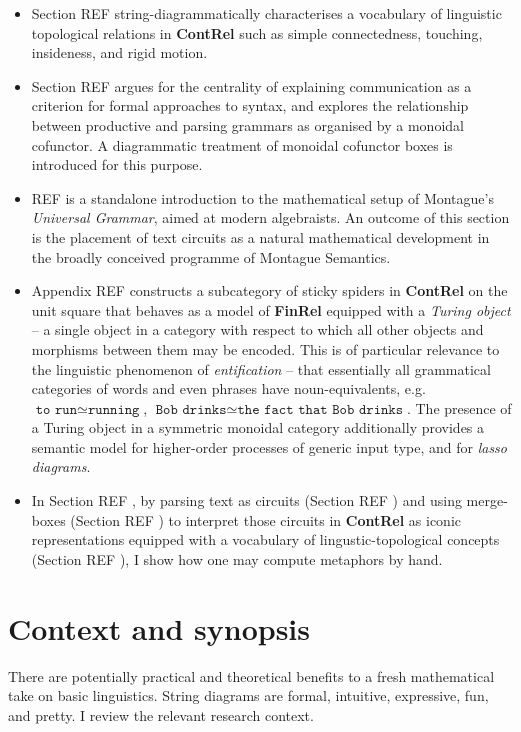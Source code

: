 \begin{myboxB}
\begin{itemize}
\item Section \bR REF \e string-diagrammatically characterises a vocabulary of linguistic topological relations in \textbf{ContRel} such as simple connectedness, touching, insideness, and rigid motion.

\item Section \bR REF \e argues for the centrality of explaining communication as a criterion for formal approaches to syntax, and explores the relationship between productive and parsing grammars as organised by a monoidal cofunctor. A diagrammatic treatment of monoidal cofunctor boxes is introduced for this purpose.

\item \bR REF \e is a standalone introduction to the mathematical setup of Montague's \emph{Universal Grammar}, aimed at modern algebraists. An outcome of this section is the placement of text circuits as a natural mathematical development in the broadly conceived programme of Montague Semantics.

\item Appendix \bR REF \e constructs a subcategory of sticky spiders in \textbf{ContRel} on the unit square that behaves as a model of \textbf{FinRel} equipped with a \emph{Turing object} -- a single object in a category with respect to which all other objects and morphisms between them may be encoded. This is of particular relevance to the linguistic phenomenon of \emph{entification} -- that essentially all grammatical categories of words and even phrases have noun-equivalents, e.g. $\texttt{to run} \simeq \texttt{running}$, $\texttt{Bob drinks} \simeq \texttt{the fact that Bob drinks}$. The presence of a Turing object in a symmetric monoidal category additionally provides a semantic model for higher-order processes of generic input type, and for \emph{lasso diagrams}.

\item In Section \bR REF \e, by parsing text as circuits (Section \bR REF \e) and using merge-boxes (Section \bR REF \e) to interpret those circuits in \textbf{ContRel} as iconic representations equipped with a vocabulary of lingustic-topological concepts (Section \bR REF \e), I show how one may compute metaphors by hand.

\end{itemize}
\end{myboxB}
\vfill
\clearpage
\clearpage
\newpage

\setcounter{chapter}{-1}
\chapter{Context and synopsis}
There are potentially practical and theoretical benefits to a fresh mathematical take on basic linguistics. String diagrams are formal, intuitive, expressive, fun, and pretty. I review the relevant research context.
\clearpage
\newpage

\clearpage
\newpage
\label{sec:proctheory}
\clearpage
\newpage


